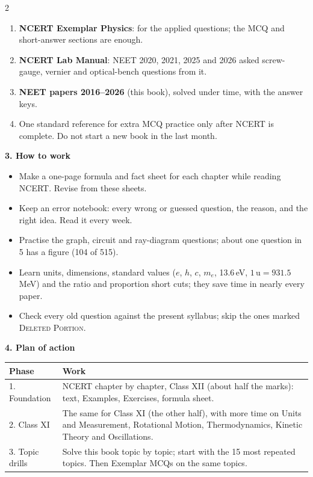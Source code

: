 \begin{multicols}{2}
\begin{enumerate}[leftmargin=1.3em,itemsep=2pt,topsep=0pt]
\item \textbf{NCERT Exemplar Physics}: for the applied questions; the MCQ and short-answer sections are enough.
\item \textbf{NCERT Lab Manual}: NEET 2020, 2021, 2025 and 2026 asked screw-gauge, vernier and optical-bench questions from it.
\item \textbf{NEET papers 2016--2026} (this book), solved under time, with the answer keys.
\item One standard reference for extra MCQ practice only after NCERT is complete. Do not start a new book in the last month.
\end{enumerate}\medskip
\textbf{\color{crimson}3. How to work}\par\smallskip
\begin{itemize}[leftmargin=1.1em,itemsep=2pt,topsep=0pt]
\item Make a one-page formula and fact sheet for each chapter while reading NCERT. Revise from these sheets.
\item Keep an error notebook: every wrong or guessed question, the reason, and the right idea. Read it every week.
\item Practise the graph, circuit and ray-diagram questions; about one question in 5 has a figure (104 of 515).
\item Learn units, dimensions, standard values ($e$, $h$, $c$, $m_e$, 13.6\,eV, $1\,\mathrm u = 931.5$\,MeV) and the ratio and proportion short cuts; they save time in nearly every paper.
\item Check every old question against the present syllabus; skip the ones marked \textsc{Deleted Portion}.
\end{itemize}
\columnbreak
\textbf{\color{crimson}4. Plan of action}\par\smallskip
{\small\renewcommand{\arraystretch}{1.25}
\begin{tabularx}{\linewidth}{@{}l>{\raggedright\arraybackslash}X@{}}\toprule
Phase & Work\\\midrule
1. Foundation & NCERT chapter by chapter, Class XII (about half the marks): text, Examples, Exercises, formula sheet.\\
2. Class XI & The same for Class XI (the other half), with more time on Units and Measurement, Rotational Motion, Thermodynamics, Kinetic Theory and Oscillations.\\
3. Topic drills & Solve this book topic by topic; start with the 15 most repeated topics. Then Exemplar MCQs on the same topics.\\

\end{tabularx}}
\end{multicols}
